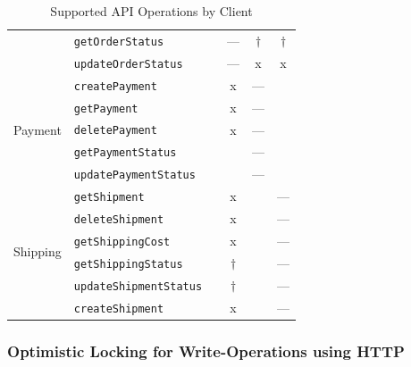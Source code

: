 \begin{table}[!htb]
\begin{tabular}{@{}llcccc@{}}
                                            & \texttt{getOrderStatus}               &           & ---       & $\dagger$ & $\dagger$ \\
                                            & \texttt{updateOrderStatus}            &           & ---       & x         & x \\
        \midrule
        \multirow{5}{*}{Payment}            & \texttt{createPayment}                &           & x         & ---       & \\
                                            & \texttt{getPayment}                   &           & x         & ---       & \\
                                            & \texttt{deletePayment}                &           & x         & ---       & \\
                                            & \texttt{getPaymentStatus}             &           &           & ---       & \\
                                            & \texttt{updatePaymentStatus}          &           &           & ---       & \\
        \midrule
        \multirow{6}{*}{Shipping}           & \texttt{getShipment}                  &           & x         &           & --- \\
                                            & \texttt{deleteShipment}               &           & x         &           & --- \\
                                            & \texttt{getShippingCost}              &           & x         &           & --- \\
                                            & \texttt{getShippingStatus}            &           & $\dagger$ &           & --- \\
                                            & \texttt{updateShipmentStatus}         &           & $\dagger$ &           & --- \\
                                            & \texttt{createShipment}               &           & x         &           & --- \\
        \bottomrule
    \end{tabular}
    \caption{Supported \ac{API} Operations by Client}\label{tab:ops}
\end{table}

\subsubsection{Optimistic Locking for Write-Operations using \acs{HTTP}}\label{sec:http-locking}

